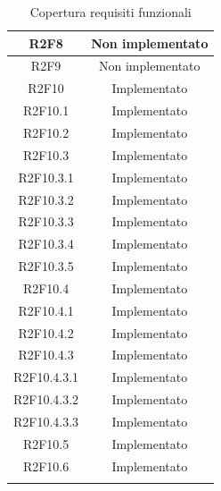 \begin{longtable}{|c|c|}
	{R2F8} & Non implementato\\
	\hline
	{R2F9} & Non implementato\\
	\hline
	{R2F10} & Implementato\\
	\hline
	{R2F10.1} & Implementato\\
	\hline
	{R2F10.2} & Implementato\\
	\hline
	{R2F10.3} & Implementato\\  
	\hline
	{R2F10.3.1} & Implementato\\ 
	\hline
	{R2F10.3.2} & Implementato \\ 
	\hline
	{R2F10.3.3} & Implementato \\ 
	\hline
	{R2F10.3.4} & Implementato \\
	\hline                              
	{R2F10.3.5} & Implementato\\
	\hline
	{R2F10.4} & Implementato\\
	\hline
	{R2F10.4.1} & Implementato\\
	\hline
	{R2F10.4.2} & Implementato\\
	\hline
	{R2F10.4.3} & Implementato\\
	\hline
	{R2F10.4.3.1} & Implementato\\
	\hline
	{R2F10.4.3.2} & Implementato\\
	\hline
	{R2F10.4.3.3} & Implementato\\
	\hline
	{R2F10.5} & Implementato\\
	\hline
	{R2F10.6} & Implementato\\
	\hline
	\caption[Copertura requisiti funzionali]{Copertura requisiti funzionali}
	\label{}
\end{longtable}
\renewcommand{\arraystretch}{1}

\newpage
